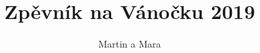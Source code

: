 \documentclass [twoside,a5paper,11pt]{article} %
\newcommand{\add}[1]{}
\begin{document}
\author{Martin a Mara}%
\title{Zpěvník na Vánočku 2019} %


\setcounter{secnumdepth}{1} %
\setcounter{tocdepth}{3} %

\newpage
\pagestyle{plain}     %
\setcounter{page}{2}  %

\newpage

\pagestyle{empty}
\tableofcontents %

\add{akordy.tex} %



\end{document}

